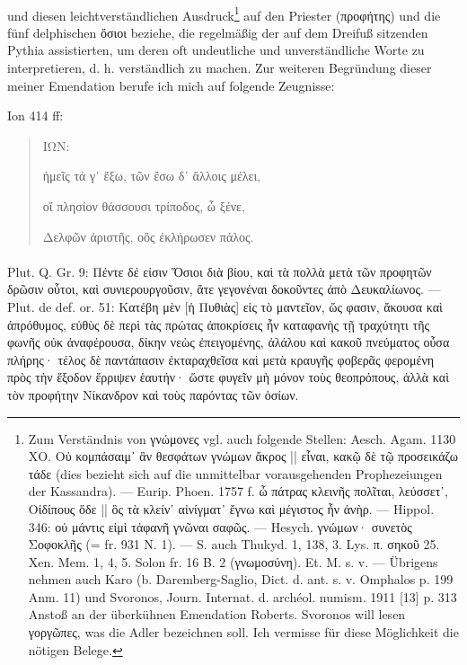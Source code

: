 \documentclass[a4paper, 11pt, oneside]{article}
\begin{document}
\paragraph{}
und diesen leichtverständlichen Ausdruck\footnote{Zum Verständnis von γνώμονες vgl. auch folgende Stellen: Aesch. Agam. 1130 ΧΟ. Οὐ κομπάσαιμ᾽ ἂν θεσφάτων γνώμων ἄκρος || εἶναι, κακῷ δὲ τῷ προσεικάζω τάδε (dies bezieht sich auf die unmittelbar vorausgehenden Prophezeiungen der Kassandra). --- Eurip. Phoen. 1757 f. ὦ πάτρας κλεινῆς πολῖται, λεύσσετ᾽, Οἰδίπους ὅδε || ὃς τὰ κλείν᾽ αἰνίγματ᾽ ἔγνω καὶ μέγιστος ἦν ἀνὴρ. --- Hippol. 346: οὐ μάντις εἰμὶ τἀφανῆ γνῶναι σαφῶς. --- Hesych. γνώμων· συνετὸς Σοφοκλῆς (= fr. 931 N. 1). --- S. auch Thukyd. 1, 138, 3. Lys. π. σηκοῦ 25. Xen. Mem. 1, 4, 5. Solon fr. 16 B. 2 (γνωμοσύνη). Et. M. s. v. --- Übrigens nehmen auch Karo (b. Daremberg-Saglio, Dict. d. ant. s. v. Omphalos p. 199 Anm. 11) und Svoronos, Journ. Internat. d. archéol. numism. 1911 [13] p. 313 Anstoß an der überkühnen Emendation Roberts. Svoronos will lesen γοργῶπες, was die Adler bezeichnen soll. Ich vermisse für diese Möglichkeit die nötigen Belege.} auf den Priester (προφήτης) und die fünf delphischen ὄσιοι beziehe, die regelmäßig der auf dem Dreifuß sitzenden Pythia assistierten, um deren oft undeutliche und unverständliche Worte zu interpretieren, d. h. verständlich zu machen. Zur weiteren Begründung dieser meiner Emendation berufe ich mich auf folgende Zeugnisse:

Ion 414 ff:
\begin{quotation}
ΙΩΝ:

ἡμεῖς τά γ᾽ ἔξω, τῶν ἔσω δ᾽ ἄλλοις μέλει,

οἵ πλησίον θάσσουσι τρίποδος, ὦ ξένε,

Δελφῶν ἀριστῆς, οὃς ἐκλήρωσεν πάλος.
\end{quotation}
\paragraph{}
Plut. Q. Gr. 9: Πέντε δέ εἰσιν Ὅσιοι διὰ βίου, καὶ τὰ πολλὰ μετὰ τῶν προφητῶν δρῶσιν οὗτοι, καὶ συνιερουργοῦσιν, ἅτε γεγονέναι δοκοῦντες ἀπὸ Δευκαλίωνος. --- Plut. de def. or. 51: Κατέβη μὲν [ἡ Πυθιὰς] εἰς τὸ μαντεῖον, ὥς φασιν, ἄκουσα καὶ ἀπρόθυμος, εὐθὺς δὲ περὶ τὰς πρώτας ἀποκρίσεις ἦν καταφανὴς τῇ τραχύτητι τῆς φωνῆς οὐκ ἀναφέρουσα, δίκην νεὼς ἐπειγομένης, ἀλάλου καὶ κακοῦ πνεύματος οὖσα πλήρης· τέλος δὲ παντάπασιν ἐκταραχθεῖσα καὶ μετὰ κραυγῆς φοβερᾶς φερομένη πρὸς τὴν ἔξοδον ἔρριψεν ἑαυτήν· ὥστε φυγεῖν μὴ μόνον τοὺς θεοπρόπους, ἀλλὰ καὶ τὸν προφήτην Νίκανδρον καὶ τοὺς παρόντας τῶν ὁσίων.
\end{document}
